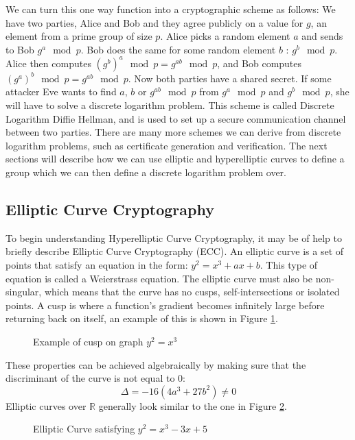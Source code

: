 We can turn this one way function into a cryptographic scheme as follows: We have two parties, Alice and Bob and they agree publicly on a value for $g$, an element from a prime group of size $p$. Alice picks a random element $a$ and sends to Bob $g^a\mod{p}$. Bob does the same for some random element $b$ : $g^b\mod{p}$. Alice then computes $(g^b)^a\mod{p} = g^{ab}\mod{p}$, and Bob computes $(g^a)^b\mod{p} = g^{ab}\mod{p}$. Now both parties have a shared secret. If some attacker Eve wants to find $a$, $b$ or $g^{ab}\mod{p}$ from $g^a\mod{p}$ and $g^b\mod{p}$, she will have to solve a discrete logarithm problem. This scheme is called Discrete Logarithm Diffie Hellman, and is used to set up a secure communication channel between two parties. There are many more schemes we can derive from discrete logarithm problems, such as certificate generation and verification.  The next sections will describe how we can use elliptic and hyperelliptic curves to define a group which we can then define a discrete logarithm problem over.
\subsection{Elliptic Curve Cryptography}
To begin understanding Hyperelliptic Curve Cryptography, it may be of help to briefly describe Elliptic Curve Cryptography (ECC). An elliptic curve is a set of points that satisfy an equation in the form: $y^2 = x^3 + ax + b$. This type of equation is called a Weierstrass equation. The elliptic curve must also be non-singular, which means that the curve has no cusps, self-intersections or isolated points. A cusp is where a function's gradient becomes infinitely large before returning back on itself, an example of this is shown in Figure \ref{fig:cusp}.
\begin{figure}[!htb]
\centering
\resizebox{5cm}{!}{}
\caption{Example of cusp on graph $y^2 = x^3$}
\label{fig:cusp}
\end{figure}
These properties can be achieved algebraically by making sure that the discriminant of the curve is not equal to 0: $$\Delta = -16(4a^3+27b^2) \neq 0$$ Elliptic curves over $\mathbb{R}$ generally look similar to the one in Figure \ref{fig:ECC}.
\begin{figure}[!htb]
\centering
\resizebox{5cm}{!}{}
\caption{Elliptic Curve satisfying $y^2=x^3-3x+5$}\label{fig:ECC}
\end{figure}
